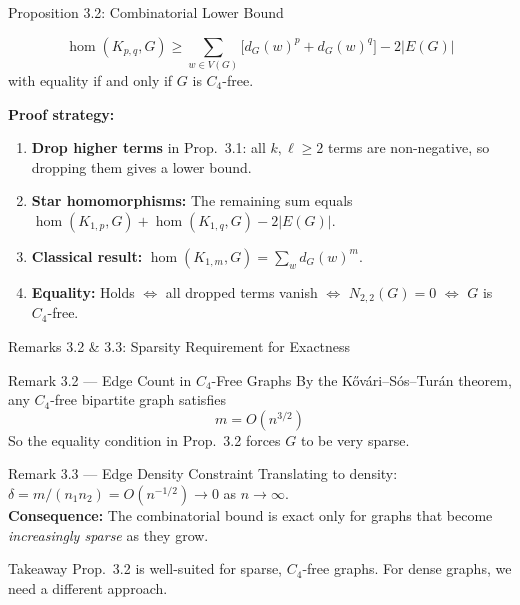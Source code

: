 \documentclass[aspectratio=169]{beamer}
\begin{document}
\begin{frame}{Proposition 3.2: Combinatorial Lower Bound}
  \begin{theorem}[Proposition 3.2]
    \[
      \hom(K_{p,q}, G) \geq \sum_{w \in V(G)} \bigl[d_G(w)^p + d_G(w)^q\bigr] - 2|E(G)|
    \]
    with equality if and only if $G$ is $C_4$-free.
  \end{theorem}

  \textbf{Proof strategy:}
  \begin{enumerate}
    \item \textbf{Drop higher terms} in Prop.\ 3.1: all $k, \ell \geq 2$ terms are non-negative, so dropping them gives a lower bound.
    \item \textbf{Star homomorphisms:} The remaining sum equals
      $\hom(K_{1,p}, G) + \hom(K_{1,q}, G) - 2|E(G)|$.
    \item \textbf{Classical result:} $\hom(K_{1,m}, G) = \sum_w d_G(w)^m$.
    \item \textbf{Equality:} Holds $\Leftrightarrow$ all dropped terms vanish $\Leftrightarrow$ $N_{2,2}(G) = 0$ $\Leftrightarrow$ $G$ is $C_4$-free.
  \end{enumerate}
\end{frame}

\begin{frame}{Remarks 3.2 \& 3.3: Sparsity Requirement for Exactness}
  \begin{block}{Remark 3.2 --- Edge Count in $C_4$-Free Graphs}
    By the K\H{o}v\'ari--S\'os--Tur\'an theorem, any $C_4$-free bipartite graph satisfies
    \[
      m = O(n^{3/2})
    \]
    So the equality condition in Prop.\ 3.2 forces $G$ to be very sparse.
  \end{block}

  \begin{block}{Remark 3.3 --- Edge Density Constraint}
    Translating to density: $\delta = m/(n_1 n_2) = O(n^{-1/2}) \to 0$ as $n \to \infty$.\\[0.3em]
    \textbf{Consequence:} The combinatorial bound is exact only for graphs that become \emph{increasingly sparse} as they grow.
  \end{block}

  \begin{alertblock}{Takeaway}
    Prop.\ 3.2 is well-suited for sparse, $C_4$-free graphs. For dense graphs, we need a different approach.
  \end{alertblock}
\end{frame}
\end{document}
